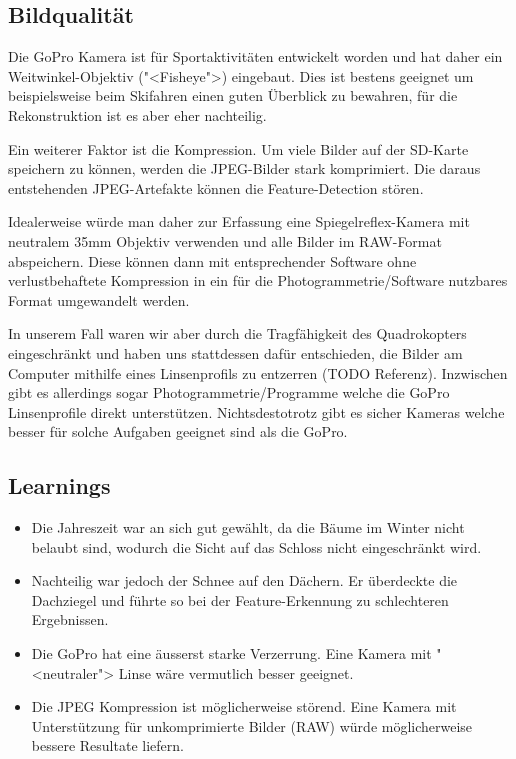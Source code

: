 \subsection{Bildqualität}\label{workflow:erfassung:bildqualitaet}

Die GoPro Kamera ist für Sportaktivitäten entwickelt worden und hat daher ein
Weitwinkel-Objektiv ("<Fisheye">) eingebaut. Dies ist bestens geeignet um
beispielsweise beim Skifahren einen guten Überblick zu bewahren, für die
Rekonstruktion ist es aber eher nachteilig.

Ein weiterer Faktor ist die Kompression. Um viele Bilder auf der SD-Karte
speichern zu können, werden die JPEG-Bilder stark komprimiert. Die daraus
entstehenden JPEG-Artefakte können die Feature-Detection stören.

Idealerweise würde man daher zur Erfassung eine Spiegelreflex-Kamera mit
neutralem 35mm Objektiv verwenden und alle Bilder im RAW-Format abspeichern.
Diese können dann mit entsprechender Software ohne verlustbehaftete Kompression
in ein für die Photogrammetrie\-/Software nutzbares Format umgewandelt werden.

In unserem Fall waren wir aber durch die Tragfähigkeit des Quadrokopters
eingeschränkt und haben uns stattdessen dafür entschieden, die Bilder am
Computer mithilfe eines Linsenprofils zu entzerren (TODO Referenz). Inzwischen
gibt es allerdings sogar Photogrammetrie\-/Programme welche die GoPro
Linsenprofile direkt unterstützen. Nichtsdestotrotz gibt es sicher Kameras
welche besser für solche Aufgaben geeignet sind als die GoPro.

\subsection{Learnings}

\begin{itemize}
	\item Die Jahreszeit war an sich gut gewählt, da die Bäume im Winter nicht
		belaubt sind, wodurch die Sicht auf das Schloss nicht eingeschränkt wird.
	\item Nachteilig war jedoch der Schnee auf den Dächern. Er überdeckte die
		Dachziegel und führte so bei der Feature-Erkennung zu schlechteren
		Ergebnissen.
	\item Die GoPro hat eine äusserst starke Verzerrung. Eine Kamera mit
		"<neutraler"> Linse wäre vermutlich besser geeignet.
	\item Die JPEG Kompression ist möglicherweise störend. Eine Kamera mit
		Unterstützung für unkomprimierte Bilder (RAW) würde möglicherweise bessere
		Resultate liefern.
\end{itemize}

